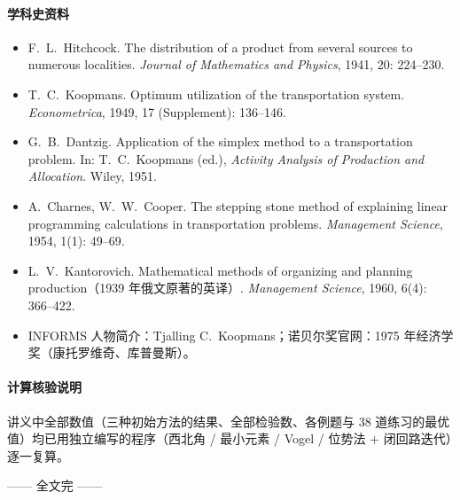 \paragraph{学科史资料}
\begin{itemize}
\item F.~L.~Hitchcock. The distribution of a product from several sources to numerous localities. \emph{Journal of Mathematics and Physics}, 1941, 20: 224--230.
\item T.~C.~Koopmans. Optimum utilization of the transportation system. \emph{Econometrica}, 1949, 17 (Supplement): 136--146.
\item G.~B.~Dantzig. Application of the simplex method to a transportation problem. In: T.~C.~Koopmans (ed.), \emph{Activity Analysis of Production and Allocation}. Wiley, 1951.
\item A.~Charnes, W.~W.~Cooper. The stepping stone method of explaining linear programming calculations in transportation problems. \emph{Management Science}, 1954, 1(1): 49--69.
\item L.~V.~Kantorovich. Mathematical methods of organizing and planning production（1939 年俄文原著的英译）. \emph{Management Science}, 1960, 6(4): 366--422.
\item INFORMS 人物简介：Tjalling C.~Koopmans；诺贝尔奖官网：1975 年经济学奖（康托罗维奇、库普曼斯）。
\end{itemize}
\paragraph{计算核验说明}
讲义中全部数值（三种初始方法的结果、全部检验数、各例题与 38 道练习的最优值）均已用独立编写的程序（西北角 / 最小元素 / Vogel / 位势法 + 闭回路迭代）逐一复算。
\vspace{6pt}
\begin{center}\small\color{blue2}—— 全文完 ——\end{center}
